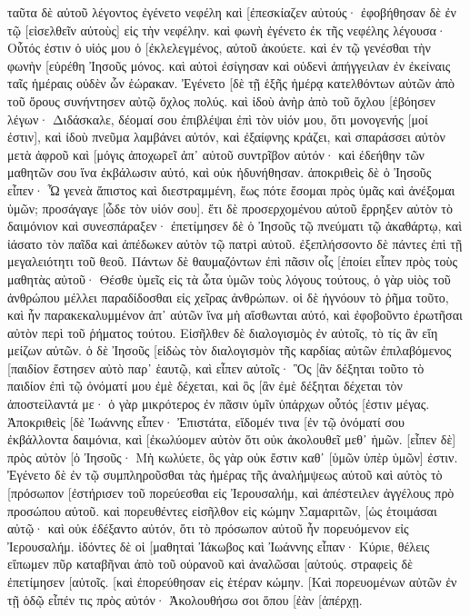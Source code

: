 ταῦτα δὲ αὐτοῦ λέγοντος ἐγένετο νεφέλη καὶ [ἐπεσκίαζεν αὐτούς· ἐφοβήθησαν δὲ ἐν τῷ [εἰσελθεῖν αὐτοὺς] εἰς τὴν νεφέλην. 
καὶ φωνὴ ἐγένετο ἐκ τῆς νεφέλης λέγουσα· Οὗτός ἐστιν ὁ υἱός μου ὁ [ἐκλελεγμένος, αὐτοῦ ἀκούετε. 
καὶ ἐν τῷ γενέσθαι τὴν φωνὴν [εὑρέθη Ἰησοῦς μόνος. καὶ αὐτοὶ ἐσίγησαν καὶ οὐδενὶ ἀπήγγειλαν ἐν ἐκείναις ταῖς ἡμέραις οὐδὲν ὧν ἑώρακαν. 
Ἐγένετο [δὲ τῇ ἑξῆς ἡμέρᾳ κατελθόντων αὐτῶν ἀπὸ τοῦ ὄρους συνήντησεν αὐτῷ ὄχλος πολύς. 
καὶ ἰδοὺ ἀνὴρ ἀπὸ τοῦ ὄχλου [ἐβόησεν λέγων· Διδάσκαλε, δέομαί σου ἐπιβλέψαι ἐπὶ τὸν υἱόν μου, ὅτι μονογενής [μοί ἐστιν], 
καὶ ἰδοὺ πνεῦμα λαμβάνει αὐτόν, καὶ ἐξαίφνης κράζει, καὶ σπαράσσει αὐτὸν μετὰ ἀφροῦ καὶ [μόγις ἀποχωρεῖ ἀπ᾽ αὐτοῦ συντρῖβον αὐτόν· 
καὶ ἐδεήθην τῶν μαθητῶν σου ἵνα ἐκβάλωσιν αὐτό, καὶ οὐκ ἠδυνήθησαν. 
ἀποκριθεὶς δὲ ὁ Ἰησοῦς εἶπεν· Ὦ γενεὰ ἄπιστος καὶ διεστραμμένη, ἕως πότε ἔσομαι πρὸς ὑμᾶς καὶ ἀνέξομαι ὑμῶν; προσάγαγε [ὧδε τὸν υἱόν σου]. 
ἔτι δὲ προσερχομένου αὐτοῦ ἔρρηξεν αὐτὸν τὸ δαιμόνιον καὶ συνεσπάραξεν· ἐπετίμησεν δὲ ὁ Ἰησοῦς τῷ πνεύματι τῷ ἀκαθάρτῳ, καὶ ἰάσατο τὸν παῖδα καὶ ἀπέδωκεν αὐτὸν τῷ πατρὶ αὐτοῦ. 
ἐξεπλήσσοντο δὲ πάντες ἐπὶ τῇ μεγαλειότητι τοῦ θεοῦ. Πάντων δὲ θαυμαζόντων ἐπὶ πᾶσιν οἷς [ἐποίει εἶπεν πρὸς τοὺς μαθητὰς αὐτοῦ· 
Θέσθε ὑμεῖς εἰς τὰ ὦτα ὑμῶν τοὺς λόγους τούτους, ὁ γὰρ υἱὸς τοῦ ἀνθρώπου μέλλει παραδίδοσθαι εἰς χεῖρας ἀνθρώπων. 
οἱ δὲ ἠγνόουν τὸ ῥῆμα τοῦτο, καὶ ἦν παρακεκαλυμμένον ἀπ᾽ αὐτῶν ἵνα μὴ αἴσθωνται αὐτό, καὶ ἐφοβοῦντο ἐρωτῆσαι αὐτὸν περὶ τοῦ ῥήματος τούτου. 
Εἰσῆλθεν δὲ διαλογισμὸς ἐν αὐτοῖς, τὸ τίς ἂν εἴη μείζων αὐτῶν. 
ὁ δὲ Ἰησοῦς [εἰδὼς τὸν διαλογισμὸν τῆς καρδίας αὐτῶν ἐπιλαβόμενος [παιδίον ἔστησεν αὐτὸ παρ᾽ ἑαυτῷ, 
καὶ εἶπεν αὐτοῖς· Ὃς [ἂν δέξηται τοῦτο τὸ παιδίον ἐπὶ τῷ ὀνόματί μου ἐμὲ δέχεται, καὶ ὃς [ἂν ἐμὲ δέξηται δέχεται τὸν ἀποστείλαντά με· ὁ γὰρ μικρότερος ἐν πᾶσιν ὑμῖν ὑπάρχων οὗτός [ἐστιν μέγας. 
Ἀποκριθεὶς [δὲ Ἰωάννης εἶπεν· Ἐπιστάτα, εἴδομέν τινα [ἐν τῷ ὀνόματί σου ἐκβάλλοντα δαιμόνια, καὶ [ἐκωλύομεν αὐτὸν ὅτι οὐκ ἀκολουθεῖ μεθ᾽ ἡμῶν. 
[εἶπεν δὲ] πρὸς αὐτὸν [ὁ Ἰησοῦς· Μὴ κωλύετε, ὃς γὰρ οὐκ ἔστιν καθ᾽ [ὑμῶν ὑπὲρ ὑμῶν] ἐστιν. 
Ἐγένετο δὲ ἐν τῷ συμπληροῦσθαι τὰς ἡμέρας τῆς ἀναλήμψεως αὐτοῦ καὶ αὐτὸς τὸ [πρόσωπον [ἐστήρισεν τοῦ πορεύεσθαι εἰς Ἰερουσαλήμ, 
καὶ ἀπέστειλεν ἀγγέλους πρὸ προσώπου αὐτοῦ. καὶ πορευθέντες εἰσῆλθον εἰς κώμην Σαμαριτῶν, [ὡς ἑτοιμάσαι αὐτῷ· 
καὶ οὐκ ἐδέξαντο αὐτόν, ὅτι τὸ πρόσωπον αὐτοῦ ἦν πορευόμενον εἰς Ἰερουσαλήμ. 
ἰδόντες δὲ οἱ [μαθηταὶ Ἰάκωβος καὶ Ἰωάννης εἶπαν· Κύριε, θέλεις εἴπωμεν πῦρ καταβῆναι ἀπὸ τοῦ οὐρανοῦ καὶ ἀναλῶσαι [αὐτούς. 
στραφεὶς δὲ ἐπετίμησεν [αὐτοῖς. 
[καὶ ἐπορεύθησαν εἰς ἑτέραν κώμην. 
[Καὶ πορευομένων αὐτῶν ἐν τῇ ὁδῷ εἶπέν τις πρὸς αὐτόν· Ἀκολουθήσω σοι ὅπου [ἐὰν [ἀπέρχῃ. 

